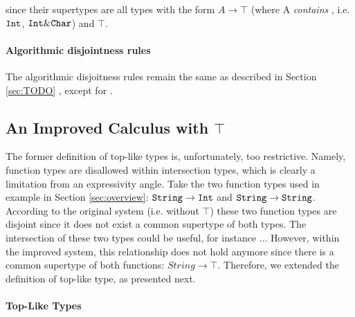 

since their supertypes are all types with the form $A \to \top$ 
(where A \emph{contains} , i.e. $\texttt{Int}$, $\texttt{Int} \& \texttt{Char}$) and $\top$.



\paragraph{Algorithmic disjointness rules}

The algorithmic disjoitness rules remain the same as described in Section \ref{sec:TODO} , except
for .

\subsection{An Improved Calculus with $\top$}

The former definition of top-like types is, unfortunately, too restrictive.
Namely, function types are disallowed within intersection types, which is clearly a limitation from an expressivity
angle.
Take the two function types used in example in Section \ref{sec:overview}: 
$\texttt{String} \to \texttt{Int}$ and $\texttt{String} \to \texttt{String}$. 
According to the original system (i.e. without $\top$) these two function types are disjoint since it does not exist
a common supertype of both types. 
The intersection of these two types could be useful, for instance ... 
However, within the improved system, this relationship does not hold anymore since there is a common supertype of both
functions: $String \to \top$.
Therefore, we extended the definition of top-like type, as presented next.

\paragraph{Top-Like Types}

